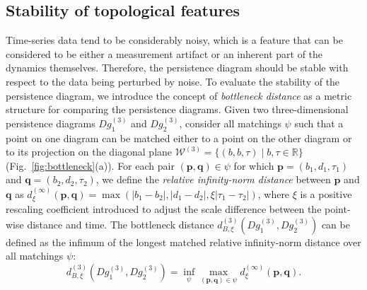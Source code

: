 \documentclass[twocolumn,pre,amsmath,amssymb]{revtex4-1}
\newcommand{\bp}{\ensuremath{\boldsymbol{p}}}
\newcommand{\bq}{\ensuremath{\boldsymbol{q}}}
\begin{document}
\subsection{Stability of topological features}
Time-series data tend to be considerably noisy, 
which is a feature that can be considered to be either
a measurement artifact or an inherent part of the dynamics themselves.
Therefore, the persistence diagram should be stable 
with respect to the data being perturbed by noise.
To evaluate the stability of the persistence diagram, 
we introduce the concept of \textit{bottleneck distance} 
as a metric structure for comparing the persistence diagrams.
Given two three-dimensional persistence diagrams $Dg_1^{(3)}$ and $Dg_2^{(3)}$, consider all matchings $\psi$ such that a point on one diagram can be matched 
either to a point on the other diagram 
or to its projection on the diagonal plane $\mathcal{W}^{(3)} = \{(b, b, \tau) \mid b,\tau \in \mathbb{R}\}$ (Fig.~\ref{fig:bottleneck}(a)). 
For each pair $(\bp, \bq) \in \psi$ for which $\bp=\left(b_1,d_1,\tau_1\right)$ and $\bq=\left(b_2,d_2,\tau_2\right)$, we define the \textit{relative infinity-norm distance} between $\bp$ and $\bq$ as $d^{(\infty)}_{\xi}(\bp, \bq)=\max\left(|b_1-b_2|, |d_1-d_2|, \xi|\tau_1-\tau_2|\right)$,
where $\xi$ is a positive rescaling coefficient introduced to adjust the scale difference between the point-wise distance and time.
The bottleneck distance $d^{(3)}_{B, \xi}(Dg_{1}^{(3)},Dg_{2}^{(3)})$ 
can be defined as the infimum of the longest matched relative infinity-norm distance over all matchings $\psi$:
\begin{equation}\label{eqn:bottleneck:def}
d^{(3)}_{B, \xi}(Dg_{1}^{(3)},Dg_{2}^{(3)}) = \inf_{\psi} \max_{(\bp,\bq) \in \psi} d^{(\infty)}_{\xi}(\bp, \bq).
\end{equation}
\end{document}
